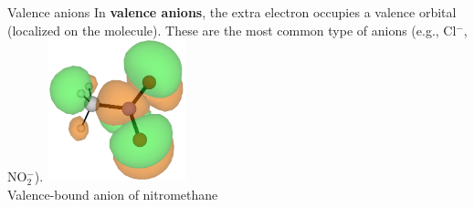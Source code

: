 \documentclass[9pt,t,xcolor=table]{beamer}
\begin{document}
\begin{frame}{\huge Valence anions}\large
    \vspace{5pt}
    In \textbf{valence anions}, the extra electron occupies a valence orbital (localized on the molecule).
    These are the most common type of anions (e.g., Cl$^-$, NO$_2^-$).
    \vfill
    \centering
    \includegraphics[width=0.3\textwidth]{Figs/MeNO2_VBS.png}\\
	\vspace{10pt}
	\small Valence-bound anion of nitromethane
\end{frame}

\end{document}
